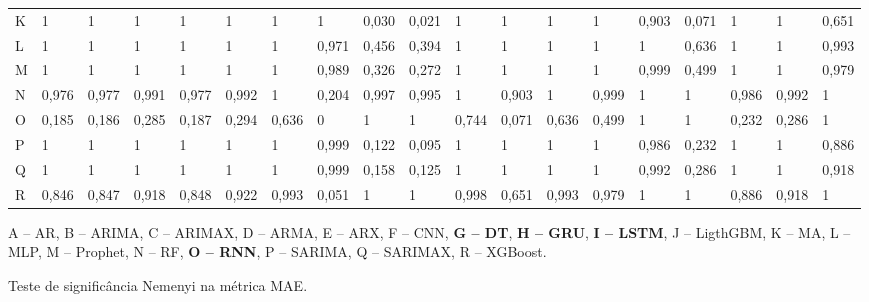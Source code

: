 \begin{landscape}
\begin{table}[!htb]
\begin{tabular}{@{}lllllllllllllllllll@{}}
K      & 1     & 1     & 1     & 1     & 1     & 1     & 1     & 0,030 & 0,021 & 1     & 1     & 1     & 1     & 0,903 & 0,071 & 1     & 1     & 0,651 \\
L      & 1     & 1     & 1     & 1     & 1     & 1     & 0,971 & 0,456 & 0,394 & 1     & 1     & 1     & 1     & 1     & 0,636 & 1     & 1     & 0,993 \\
M      & 1     & 1     & 1     & 1     & 1     & 1     & 0,989 & 0,326 & 0,272 & 1     & 1     & 1     & 1     & 0,999 & 0,499 & 1     & 1     & 0,979 \\
N      & 0,976 & 0,977 & 0,991 & 0,977 & 0,992 & 1     & 0,204 & 0,997 & 0,995 & 1     & 0,903 & 1     & 0,999 & 1     & 1     & 0,986 & 0,992 & 1     \\
O      & 0,185 & 0,186 & 0,285 & 0,187 & 0,294 & 0,636 & 0     & 1     & 1     & 0,744 & 0,071 & 0,636 & 0,499 & 1     & 1     & 0,232 & 0,286 & 1     \\
P      & 1     & 1     & 1     & 1     & 1     & 1     & 0,999 & 0,122 & 0,095 & 1     & 1     & 1     & 1     & 0,986 & 0,232 & 1     & 1     & 0,886 \\
Q      & 1     & 1     & 1     & 1     & 1     & 1     & 0,999 & 0,158 & 0,125 & 1     & 1     & 1     & 1     & 0,992 & 0,286 & 1     & 1     & 0,918 \\
R      & 0,846 & 0,847 & 0,918 & 0,848 & 0,922 & 0,993 & 0,051 & 1     & 1     & 0,998 & 0,651 & 0,993 & 0,979 & 1     & 1     & 0,886 & 0,918 & 1     \\ \bottomrule
\end{tabular}
	\vspace{2mm}
	
	\captionsetup{justification=centering} %
	A -- AR,
	B -- ARIMA,
	C -- ARIMAX,
	D -- ARMA,
	E -- ARX,
	F -- CNN,
	\textbf{G -- DT},
	\textbf{H -- GRU},
	\textbf{I -- LSTM},
	J -- LigthGBM,
	K -- MA,
	L -- MLP,
	M -- Prophet,
	N -- RF,
	\textbf{O -- RNN},
	P -- SARIMA,
	Q -- SARIMAX,
	R -- XGBoost.
	
\end{table}

	\begin{table}[!htb]
	\caption{Teste de significância Nemenyi na métrica MAE.}\label{tb:nemenyi1}
	\centering


\end{table}
\end{landscape}

